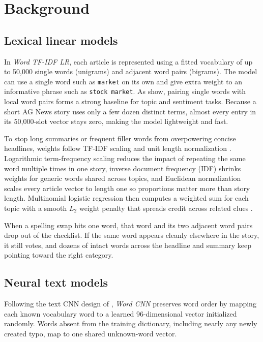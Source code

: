 \chapter{Background}\label{ch:background}

\section{Lexical linear models}
In \textit{Word TF-IDF LR}, each article is represented using a fitted vocabulary of up to 50,000 single words (unigrams) and adjacent word pairs (bigrams). The model can use a single word such as \texttt{market} on its own and give extra weight to an informative phrase such as \texttt{stock market}. As \citet{wang2012} show, pairing single words with local word pairs forms a strong baseline for topic and sentiment tasks. Because a short AG News story uses only a few dozen distinct terms, almost every entry in its 50,000-slot vector stays zero, making the model lightweight and fast.

To stop long summaries or frequent filler words from overpowering concise headlines, weights follow TF-IDF scaling and unit length normalization \citep{tfidf}. Logarithmic term-frequency scaling reduces the impact of repeating the same word multiple times in one story, inverse document frequency (IDF) shrinks weights for generic words shared across topics, and Euclidean normalization scales every article vector to length one so proportions matter more than story length. Multinomial logistic regression then computes a weighted sum for each topic with a smooth $L_2$ weight penalty that spreads credit across related clues \citep{logisticregression}.

When a spelling swap hits one word, that word and its two adjacent word pairs drop out of the checklist. If the same word appears cleanly elsewhere in the story, it still votes, and dozens of intact words across the headline and summary keep pointing toward the right category.

\section{Neural text models}
Following the text CNN design of \citet{kim2014}, \textit{Word CNN} preserves word order by mapping each known vocabulary word to a learned 96-dimensional vector initialized randomly. Words absent from the training dictionary, including nearly any newly created typo, map to one shared unknown-word vector.


